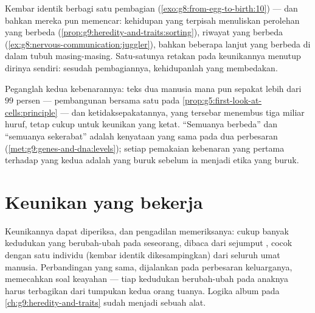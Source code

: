 \begin{example}\label{ex:g9:unique-individuals:twins}
Kembar identik berbagi satu pembagian
(\cref{exo:g8:from-egg-to-birth:10}) --- dan bahkan mereka
pun memencar: kehidupan yang terpisah menuliskan 
perolehan yang berbeda
(\cref{prop:g9:heredity-and-traits:sorting}), riwayat
 yang berbeda
(\cref{ex:g8:nervous-communication:juggler}), bahkan
beberapa  lanjut yang berbeda di dalam  tubuh
masing-masing. Satu-satunya retakan pada keunikannya menutup
dirinya sendiri: sesudah pembagiannya, kehidupanlah yang
membedakan.
\end{example}

\begin{remark}\label{rem:g9:unique-individuals:alike}
Peganglah kedua kebenarannya: teks  dua manusia mana pun
sepakat lebih dari $99$ persen --- pembangunan bersama satu
 pada \cref{prop:g5:first-look-at-cells:principle}
--- dan ketidaksepakatannya, yang tersebar menembus tiga
miliar huruf, tetap cukup untuk keunikan yang ketat.
``Semuanya berbeda'' dan ``semuanya sekerabat'' adalah
kenyataan yang sama pada dua perbesaran
(\cref{met:g9:genes-and-dna:levels}); setiap pemakaian
kebenaran yang pertama terhadap yang kedua adalah 
yang buruk sebelum ia menjadi etika yang buruk.
\end{remark}

\section{Keunikan yang bekerja}

\begin{example}\label{ex:g9:unique-individuals:forensics}
Keunikannya dapat diperiksa, dan pengadilan memeriksanya:
cukup banyak kedudukan yang berubah-ubah pada seseorang,
dibaca dari sejumput , cocok dengan satu individu
(kembar identik dikesampingkan) dari seluruh umat manusia.
Perbandingan yang sama, dijalankan pada perbesaran
keluarganya, memecahkan soal keayahan --- tiap kedudukan
berubah-ubah pada anaknya harus terbagikan dari tumpukan
kedua orang tuanya. Logika album pada
\cref{ch:g9:heredity-and-traits} sudah menjadi sebuah alat.
\end{example}

